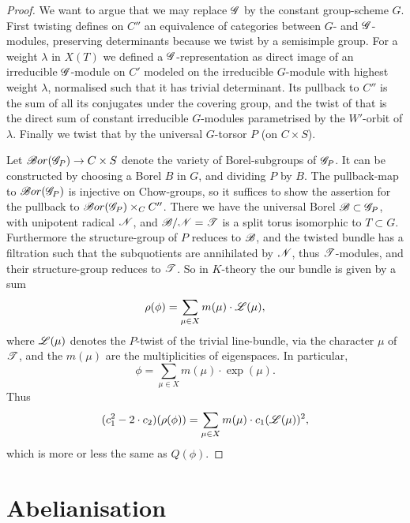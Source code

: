 \documentclass[12pt,english]{smfart}
\theoremstyle{plain} \newtheorem{innerthm}{Theorem} \newtheorem{innerlem}{Lemma} \newtheorem{innerprop}{Proposition} \newtheorem{innercor}{Corollary} \theoremstyle{definition} \newtheorem{innerdefn}{Definition} \newtheorem{innerconstr}{Construction} \theoremstyle{remark} \newtheorem*{remark}{Remark} \newtheorem*{remarks}{Remarks} \newtheorem*{applications}{Applications}
\begin{document}
\begin{proof}
We want to argue that we may replace $\mathscr{G}$ by the constant group-scheme $G$. First twisting defines on $C''$ an equivalence of categories between $G$- and $\mathscr{G}$-modules, preserving determinants because we twist by a semisimple group. For a weight $\lambda$ in $X(T)$ we defined a $\mathscr{G}$-representation as direct image of an irreducible $\mathscr{G}$-module on $C'$ modeled on the irreducible $G$-module with highest weight $\lambda$, normalised such that it has trivial determinant. Its pullback to $C''$ is the sum of all its conjugates under the covering group, and the twist of that is the direct sum of constant irreducible $G$-modules parametrised by the $W'$-orbit of $\lambda$. Finally we twist that by the universal $G$-torsor $P$ (on $C\times S$).

Let $\mathscr{B}or(\mathscr{G}_P)\to C\times S$ denote the variety of Borel-subgroups of $\mathscr{G}_P$. It can be constructed by choosing a Borel $B$ in $G$, and dividing $P$ by $B$. The pullback-map to $\mathscr{B}or(\mathscr{G}_P)$ is injective on Chow-groups, so it suffices to show the assertion for the pullback to $\mathscr{B}or(\mathscr{G}_P)\times_C C''$. There we have the universal Borel $\mathscr{B}\subset\mathscr{G}_P$, with unipotent radical $\mathscr{N}$, and $\mathscr{B}/\mathscr{N}=\mathscr{T}$ is a split torus isomorphic to $T\subset G$. Furthermore the structure-group of $P$ reduces to $\mathscr{B}$, and the twisted bundle has a filtration such that the subquotients are annihilated by $\mathscr{N}$, thus $\mathscr{T}$-modules, and their structure-group reduces to $\mathscr{T}$. So in $K$-theory the our bundle is given by a sum
\[
\rho(\phi)=\sum_{\mu\in X}m(\mu)\cdot\mathscr{L}(\mu),
\]
where $\mathscr{L}(\mu)$ denotes the $P$-twist of the trivial line-bundle, via the character $\mu$ of $\mathscr{T}$, and the $m(\mu)$ are the multiplicities of eigenspaces. In particular,
\[
\phi=\sum_{\mu\in X}m(\mu)\cdot\exp(\mu).
\]
Thus
\[
(c_1^2-2\cdot c_2)(\rho(\phi))=\sum_{\mu\in X}m(\mu)\cdot c_1(\mathscr{L}(\mu))^2,
\]
which is more or less the same as $Q(\phi)$.
\end{proof}

\section{Abelianisation}\label{sec:III}
\end{document}

